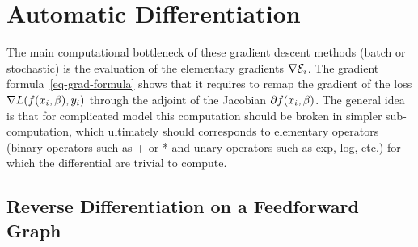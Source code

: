 

\section{Automatic Differentiation}

The main computational bottleneck of these gradient descent methods (batch or stochastic) is the evaluation of the elementary gradients $\nabla \mathcal{E}_i$. The gradient formula~\eqref{eq-grad-formula} shows that it requires to remap the gradient of the loss $\nabla L( f(x_i,\beta),y_i )$ through the adjoint of the Jacobian $\partial f(x_i,\beta)$. 
%
The general idea is that for complicated model this computation should be broken in simpler sub-computation, which ultimately should corresponds to elementary operators (binary operators such as + or * and unary operators such as exp, log, etc.) for which the differential are trivial to compute.

\subsection{Reverse Differentiation on a Feedforward Graph}
\label{sec-reversemode-simple}

